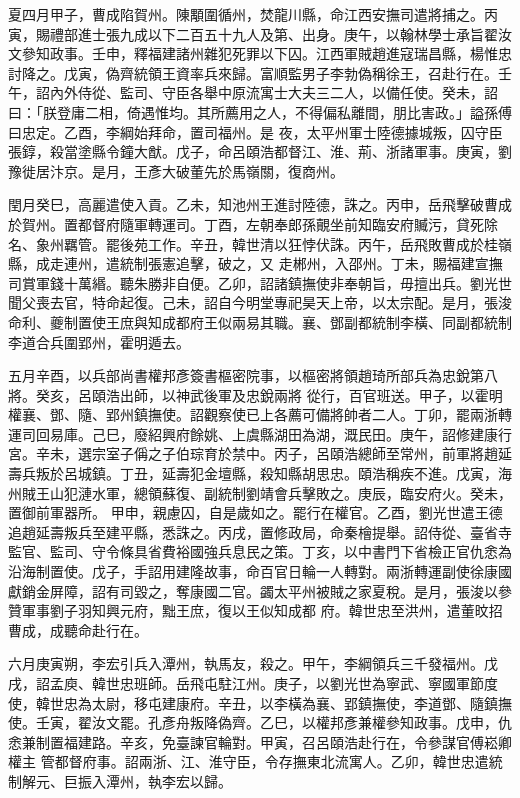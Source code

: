 \begin{pinyinscope}
 夏四月甲子，曹成陷賀州。陳顒圍循州，焚龍川縣，命江西安撫司遣將捕之。丙
 寅，賜禮部進士張九成以下二百五十九人及第、出身。庚午，以翰林學士承旨翟汝文參知政事。壬申，釋福建諸州雜犯死罪以下囚。江西軍賊趙進寇瑞昌縣，楊惟忠討降之。戊寅，偽齊統領王資率兵來歸。富順監男子李勃偽稱徐王，召赴行在。壬午，詔內外侍從、監司、守臣各舉中原流寓士大夫三二人，以備任使。癸未，詔曰：「朕登庸二相，倚遇惟均。其所薦用之人，不得偏私離間，朋比害政。」謚孫傅曰忠定。乙酉，李綱始拜命，置司福州。是
 夜，太平州軍士陸德據城叛，囚守臣張錞，殺當塗縣令鐘大猷。戊子，命呂頤浩都督江、淮、荊、浙諸軍事。庚寅，劉豫徙居汴京。是月，王彥大破董先於馬嶺關，復商州。



 閏月癸巳，高麗遣使入貢。乙未，知池州王進討陸德，誅之。丙申，岳飛擊破曹成於賀州。置都督府隨軍轉運司。丁酉，左朝奉郎孫覿坐前知臨安府贓污，貸死除名、象州羈管。罷後苑工作。辛丑，韓世清以狂悖伏誅。丙午，岳飛敗曹成於桂嶺縣，成走連州，遣統制張憲追擊，破之，又
 走郴州，入邵州。丁未，賜福建宣撫司賞軍錢十萬緡。聽朱勝非自便。乙卯，詔諸鎮撫使非奉朝旨，毋擅出兵。劉光世聞父喪去官，特命起復。己未，詔自今明堂專祀昊天上帝，以太宗配。是月，張浚命利、夔制置使王庶與知成都府王似兩易其職。襄、鄧副都統制李橫、同副都統制李道合兵圍郢州，霍明遁去。



 五月辛酉，以兵部尚書權邦彥簽書樞密院事，以樞密將領趙琦所部兵為忠銳第八將。癸亥，呂頤浩出師，以神武後軍及忠銳兩將
 從行，百官班送。甲子，以霍明權襄、鄧、隨、郢州鎮撫使。詔觀察使已上各薦可備將帥者二人。丁卯，罷兩浙轉運司回易庫。己巳，廢紹興府餘姚、上虞縣湖田為湖，溉民田。庚午，詔修建康行宮。辛未，選宗室子偁之子伯琮育於禁中。丙子，呂頤浩總師至常州，前軍將趙延壽兵叛於呂城鎮。丁丑，延壽犯金壇縣，殺知縣胡思忠。頤浩稱疾不進。戊寅，海州賊王山犯漣水軍，總領蘇復、副統制劉靖會兵擊敗之。庚辰，臨安府火。癸未，置御前軍器所。
 甲申，親慮囚，自是歲如之。罷行在權官。乙酉，劉光世遣王德追趙延壽叛兵至建平縣，悉誅之。丙戌，置修政局，命秦檜提舉。詔侍從、臺省寺監官、監司、守令條具省費裕國強兵息民之策。丁亥，以中書門下省檢正官仇悆為沿海制置使。戊子，手詔用建隆故事，命百官日輪一人轉對。兩浙轉運副使徐康國獻銷金屏障，詔有司毀之，奪康國二官。蠲太平州被賊之家夏稅。是月，張浚以參贊軍事劉子羽知興元府，黜王庶，復以王似知成都
 府。韓世忠至洪州，遣董旼招曹成，成聽命赴行在。



 六月庚寅朔，李宏引兵入潭州，執馬友，殺之。甲午，李綱領兵三千發福州。戊戌，詔孟庾、韓世忠班師。岳飛屯駐江州。庚子，以劉光世為寧武、寧國軍節度使，韓世忠為太尉，移屯建康府。辛丑，以李橫為襄、郢鎮撫使，李道鄧、隨鎮撫使。壬寅，翟汝文罷。孔彥舟叛降偽齊。乙巳，以權邦彥兼權參知政事。戊申，仇悆兼制置福建路。辛亥，免臺諫官輪對。甲寅，召呂頤浩赴行在，令參謀官傅崧卿權主
 管都督府事。詔兩浙、江、淮守臣，令存撫東北流寓人。乙卯，韓世忠遣統制解元、巨振入潭州，執李宏以歸。




\end{pinyinscope}
